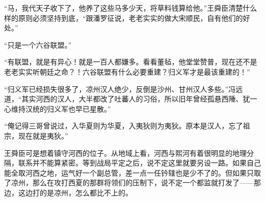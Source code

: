 “马，我代天子收下了，他养了这些马多少天，将草料钱算给他。”王舜臣清楚什么样的原则必须坚持到底，“跟潘罗征说，老老实实的做大宋顺民，自有他们的好处。”

“只是一个六谷联盟。”

“有联盟，就是有异心！就是一百人都嫌多。看看董毡，他堂堂赞普，现在还不是老老实实听朝廷之命？！六谷联盟有什么必要重建？归义军才是最该重建的！”

“归义军已经损失很多了，凉州汉人绝少，反倒是沙州、甘州汉人多些。”冯远道，“其实河西的汉人，大半都改了吐蕃人的习俗，所以旧年曾经孤悬西陲、犹一心维持汉统的归义军也早已星散。”

“俺记得三哥曾说过，入华夏则为华夏，入夷狄则为夷狄。原本是汉人，忘了祖宗，现在就是夷狄。”

王舜臣可是想着镇守河西的位子。从地域上看，河西与熙河有着很明显的地理分隔，联系并不能算紧密。等到战局平定之后，说不定这里就要另设一路。如果自己能全取河西之地，运气好一个副总管，差一点一任钤辖也是少不了的。但如果只取了凉州，那么在攻打西夏的那群将领们的压制下，说不定一个都监就打发了——那边，这边打的是凉州，怎么都比不上的。

